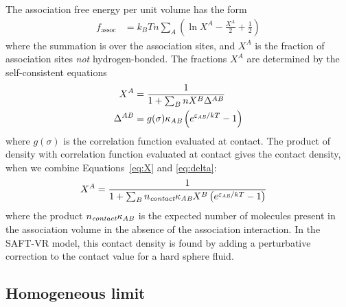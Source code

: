 \documentclass[letterpaper,twocolumn,amsmath,amssymb,jcp,10pt,aip]{revtex4-1}
\begin{document}
The association free energy per unit volume has the form
\begin{align}
  f_\text{assoc} &= k_BT n\sum_A 
                  \left(\ln X^A - \frac{X^A}{2} + \frac12\right)
\end{align}
where the summation is over the association sites, and $X^A$ is the
fraction of association sites \emph{not} hydrogen-bonded.  The
fractions $X^A$ are determined by the self-consistent equations
\begin{align}
  X^A &= \frac{1}
  {1 + \sum_B n X^B \Delta^{AB}}\label{eq:X}
  \\
  \Delta^{AB} &= g(\sigma) \kappa_\textit{AB}\left( e^{\varepsilon_\textit{AB}/kT} -
  1 \right)\label{eq:delta}
\end{align}
where $g(\sigma)$ is the correlation function evaluated at contact.
The product of density with correlation function evaluated at contact
gives the contact density, when we combine Equations~\ref{eq:X} and
\ref{eq:delta}:
\begin{align}
  X^A &= \frac{1}
  {1 + \sum_B n_\textit{contact}\kappa_\textit{AB} X^B\left( e^{\varepsilon_\textit{AB}/kT} -
  1 \right)}
\end{align}
where the product $n_\textit{contact}\kappa_\textit{AB}$ is the expected number of
molecules present in the association volume in the absence of the
association interaction.  In the SAFT-VR
model\cite{gil-villegas-1997-SAFT-VR}, this contact density is found
by adding a perturbative correction to the contact value for a hard
sphere fluid.

\subsection{Homogeneous limit}
\end{document}
